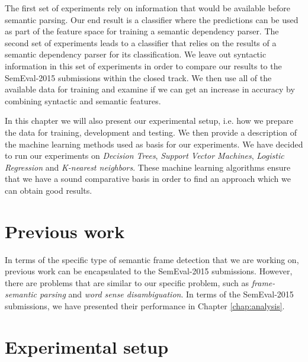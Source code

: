 The first set of experiments rely on information that would be available before semantic parsing. Our end result is a classifier where the predictions can be used as part of the feature space for training a semantic dependency parser. The second set of experiments leads to a classifier that relies on the results of a semantic dependency parser for its classification. We leave out syntactic information in this set of experiments in order to compare our results to the SemEval-2015 submissions within the closed track. We then use all of the available data for training and examine if we can get an increase in accuracy by combining syntactic and semantic features.

In this chapter we will also present our experimental setup, i.e. how we prepare the data for training, development and testing. We then provide a description of the machine learning methods used as basis for our experiments. We have decided to run our experiments on \textit{Decision Trees}, \textit{Support Vector Machines}, \textit{Logistic Regression} and \textit{K-nearest neighbors}. These machine learning algorithms ensure that we have a sound comparative basis in order to find an approach which we can obtain good results.

\section{Previous work}

In terms of the specific type of semantic frame detection that we are working on, previous work can be encapsulated to the SemEval-2015 submissions. However, there are problems that are similar to our specific problem, such as \textit{frame-semantic parsing} and \textit{word sense disambiguation}. In terms of the SemEval-2015 submissions, we have presented their performance in Chapter \ref{chap:analysis}.

\section{Experimental setup}
\label{setup}

